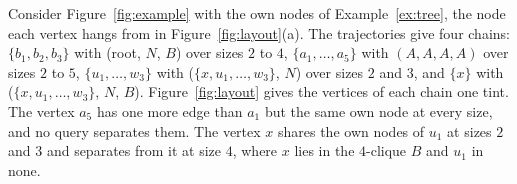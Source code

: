 \begin{example}\label{ex:chains}
Consider Figure~\ref{fig:example} with the own nodes of Example~\ref{ex:tree}, the node each vertex hangs from in Figure~\ref{fig:layout}(a).
%
The trajectories give four chains: $\{b_1,b_2,b_3\}$ with (root, $N$, $B$) over sizes $2$ to $4$, $\{a_1,\dots,a_5\}$ with $(A,A,A,A)$ over sizes $2$ to $5$, $\{u_1,\dots,w_3\}$ with ($\{x,u_1,\dots,w_3\}$, $N$) over sizes $2$ and $3$, and $\{x\}$ with ($\{x,u_1,\dots,w_3\}$, $N$, $B$).
%
Figure~\ref{fig:layout} gives the vertices of each chain one tint.
%
The vertex $a_5$ has one more edge than $a_1$ but the same own node at every size, and no query separates them.
%
The vertex $x$ shares the own nodes of $u_1$ at sizes $2$ and $3$ and separates from it at size $4$, where $x$ lies in the $4$-clique $B$ and $u_1$ in none.
\end{example}

